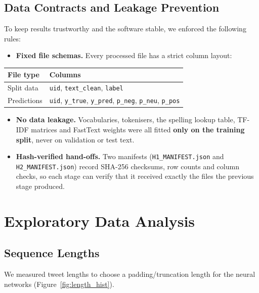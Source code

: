 \documentclass[11pt,a4paper]{article}
\begin{document}
\subsection{Data Contracts and Leakage Prevention}
To keep results trustworthy and the software stable, we enforced the following rules:

\begin{itemize}
    \item \textbf{Fixed file schemas.} Every processed file has a strict column layout:
\end{itemize}
\begin{center}
\small
\begin{tabular}{ll}
\toprule
\textbf{File type} & \textbf{Columns} \\
\midrule
Split data  & \texttt{uid}, \texttt{text\_clean}, \texttt{label} \\
Predictions & \texttt{uid}, \texttt{y\_true}, \texttt{y\_pred}, \texttt{p\_neg}, \texttt{p\_neu}, \texttt{p\_pos} \\
\bottomrule
\end{tabular}
\end{center}
\begin{itemize}
    \item \textbf{No data leakage.} Vocabularies, tokenisers, the spelling lookup table, TF-IDF matrices and FastText weights were all fitted \textbf{only on the training split}, never on validation or test text.
    \item \textbf{Hash-verified hand-offs.} Two manifests (\texttt{H1\_MANIFEST.json} and \texttt{H2\_MANIFEST.json}) record SHA-256 checksums, row counts and column checks, so each stage can verify that it received exactly the files the previous stage produced.
\end{itemize}

\section{Exploratory Data Analysis}

\subsection{Sequence Lengths}
We measured tweet lengths to choose a padding/truncation length for the neural networks (Figure~\ref{fig:length_hist}).
\end{document}
